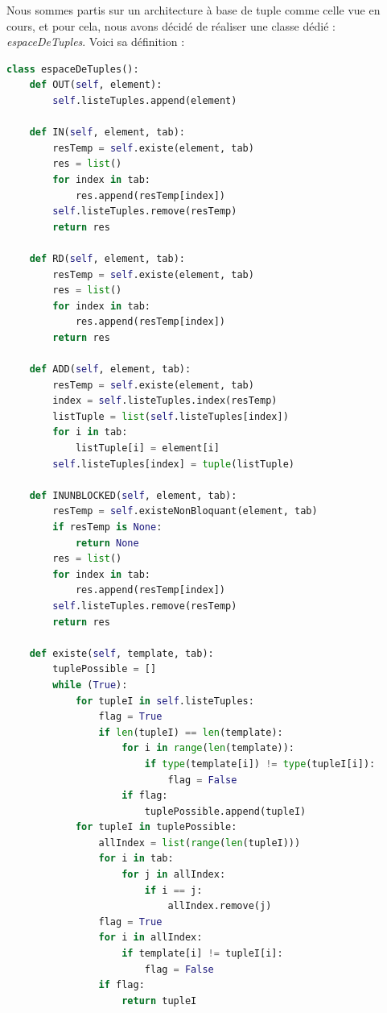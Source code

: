 \documentclass[a4paper,10pt]{article}
\begin{document}
    Nous sommes partis sur un architecture à base de tuple comme celle vue en cours, et pour cela, nous avons décidé de réaliser une classe dédié : \textit{espaceDeTuples}. Voici sa définition :
    \begin{lstlisting}[language=Python]
class espaceDeTuples():
    def OUT(self, element):
        self.listeTuples.append(element)

    def IN(self, element, tab):
        resTemp = self.existe(element, tab)
        res = list()
        for index in tab:
            res.append(resTemp[index])
        self.listeTuples.remove(resTemp)
        return res

    def RD(self, element, tab):
        resTemp = self.existe(element, tab)
        res = list()
        for index in tab:
            res.append(resTemp[index])
        return res

    def ADD(self, element, tab):
        resTemp = self.existe(element, tab)
        index = self.listeTuples.index(resTemp)
        listTuple = list(self.listeTuples[index])
        for i in tab:
            listTuple[i] = element[i]
        self.listeTuples[index] = tuple(listTuple)

    def INUNBLOCKED(self, element, tab):
        resTemp = self.existeNonBloquant(element, tab)
        if resTemp is None:
            return None
        res = list()
        for index in tab:
            res.append(resTemp[index])
        self.listeTuples.remove(resTemp)
        return res

    def existe(self, template, tab):
        tuplePossible = []
        while (True):
            for tupleI in self.listeTuples:
                flag = True
                if len(tupleI) == len(template):
                    for i in range(len(template)):
                        if type(template[i]) != type(tupleI[i]):
                            flag = False
                    if flag:
                        tuplePossible.append(tupleI)
            for tupleI in tuplePossible:
                allIndex = list(range(len(tupleI)))
                for i in tab:
                    for j in allIndex:
                        if i == j:
                            allIndex.remove(j)
                flag = True
                for i in allIndex:
                    if template[i] != tupleI[i]:
                        flag = False
                if flag:
                    return tupleI


\end{lstlisting}
\end{document}
